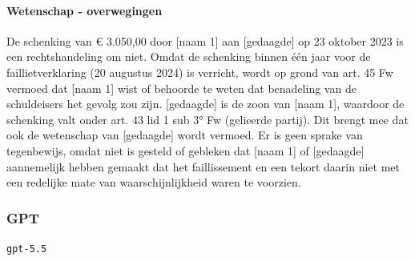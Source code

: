 \documentclass[
  dutch,
  a4paper,
]{article}
\begin{document}
\paragraph{Wetenschap - overwegingen}\label{wetenschap---overwegingen-33}

De schenking van € 3.050,00 door {[}naam 1{]} aan {[}gedaagde{]} op 23 oktober 2023 is een rechtshandeling om niet. Omdat de schenking binnen één jaar voor de faillietverklaring (20 augustus 2024) is verricht, wordt op grond van art. 45 Fw vermoed dat {[}naam 1{]} wist of behoorde te weten dat benadeling van de schuldeisers het gevolg zou zijn. {[}gedaagde{]} is de zoon van {[}naam 1{]}, waardoor de schenking valt onder art. 43 lid 1 sub 3° Fw (gelieerde partij). Dit brengt mee dat ook de wetenschap van {[}gedaagde{]} wordt vermoed. Er is geen sprake van tegenbewijs, omdat niet is gesteld of gebleken dat {[}naam 1{]} of {[}gedaagde{]} aannemelijk hebben gemaakt dat het faillissement en een tekort daarin niet met een redelijke mate van waarschijnlijkheid waren te voorzien.

\newpage


\subsubsection{GPT}\label{gpt-11}

\texttt{gpt-5.5}
\end{document}
